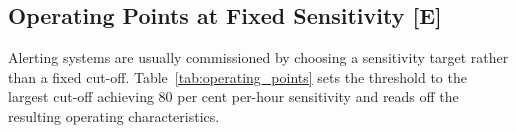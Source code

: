 \subsection{Operating Points at Fixed Sensitivity \texorpdfstring{[E]}{[E]}}
\label{sec:operating_points}

Alerting systems are usually commissioned by choosing a sensitivity target
rather than a fixed cut-off. Table~\ref{tab:operating_points} sets the threshold to the
largest cut-off achieving 80 per cent per-hour sensitivity and reads off the
resulting operating characteristics.

\begin{table}[H]
    \centering\small
\end{table}
